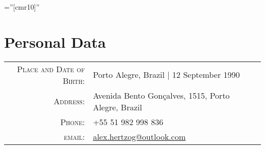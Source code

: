 \documentclass[a4paper,10pt]{article}
\begin{document}
\pagestyle{empty} %

\font\fb=''[cmr10]'' %

\par{\bigskip\par}
    
\section{Personal Data}

\begin{tabular}{rl}
    \textsc{Place and Date of Birth:} & Porto Alegre, Brazil  | 12 September 1990 \\
    \textsc{Address:}   & Avenida Bento Gonçalves, 1515, Porto Alegre, Brazil \\
    \textsc{Phone:}     & +55 51 982 998 836\\
    \textsc{email:}     & \href{mailto:alex.hertzog@outlook.com}{alex.hertzog@outlook.com}
\end{tabular}

\end{document}
